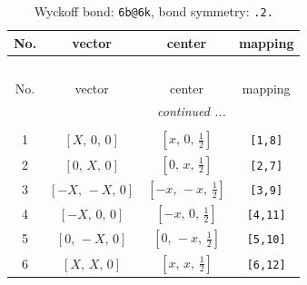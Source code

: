 \documentclass[fleqn,8pt]{jsarticle}
\begin{document}
\begin{longtable}{cccc}
\caption{Wyckoff bond: {\tt 6b@6k}, bond symmetry: {\tt .2.}}
 \\
 \hline \hline
No. & vector & center & mapping \\ \hline \endfirsthead

\multicolumn{3}{l}{\tablename\ \thetable{}} \\
 \hline \hline
No. & vector & center & mapping \\ \hline \endhead

 \hline \hline
\multicolumn{3}{r}{\footnotesize\it continued ...} \\ \endfoot

 \hline \hline
\multicolumn{3}{r}{} \\ \endlastfoot

1 & $\left[ X,\, 0,\, 0 \right]$ & $\left[ x,\, 0,\, \frac{1}{2} \right]$ & {\tt [1,8]} \\ \hline
2 & $\left[ 0,\, X,\, 0 \right]$ & $\left[ 0,\, x,\, \frac{1}{2} \right]$ & {\tt [2,7]} \\ \hline
3 & $\left[ - X,\, - X,\, 0 \right]$ & $\left[ - x,\, - x,\, \frac{1}{2} \right]$ & {\tt [3,9]} \\ \hline
4 & $\left[ - X,\, 0,\, 0 \right]$ & $\left[ - x,\, 0,\, \frac{1}{2} \right]$ & {\tt [4,11]} \\ \hline
5 & $\left[ 0,\, - X,\, 0 \right]$ & $\left[ 0,\, - x,\, \frac{1}{2} \right]$ & {\tt [5,10]} \\ \hline
6 & $\left[ X,\, X,\, 0 \right]$ & $\left[ x,\, x,\, \frac{1}{2} \right]$ & {\tt [6,12]} \\
\end{longtable}
\renewcommand{\arraystretch}{1.2}
\end{document}
